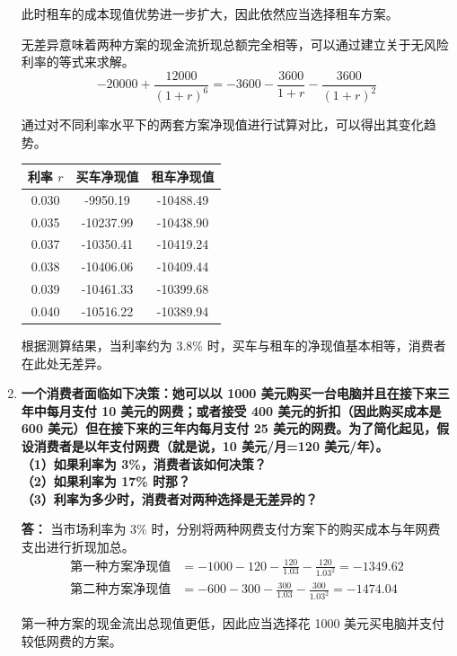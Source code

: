 \begin{enumerate}[label=\textbf{\arabic*.}, leftmargin=*]
		此时租车的成本现值优势进一步扩大，因此依然应当选择租车方案。
		
		无差异意味着两种方案的现金流折现总额完全相等，可以通过建立关于无风险利率的等式来求解。
		\[
		-20000 + \frac{12000}{(1+r)^6} = -3600 - \frac{3600}{1+r} - \frac{3600}{(1+r)^2}
		\]
		
		通过对不同利率水平下的两套方案净现值进行试算对比，可以得出其变化趋势。
		\begin{center}
			\small
			\setlength{\tabcolsep}{8pt}
			\renewcommand{\arraystretch}{1.2}
			\begin{tabular}{ccc}
				\hline
				利率 $r$ & 买车净现值 & 租车净现值 \\ \hline
				0.030 & -9950.19 & -10488.49 \\
				0.035 & -10237.99 & -10438.90 \\
				0.037 & -10350.41 & -10419.24 \\
				0.038 & -10406.06 & -10409.44 \\
				0.039 & -10461.33 & -10399.68 \\
				0.040 & -10516.22 & -10389.94 \\ \hline
			\end{tabular}
		\end{center}
		
		根据测算结果，当利率约为 3.8\% 时，买车与租车的净现值基本相等，消费者在此处无差异。
		
		\item \textbf{一个消费者面临如下决策：她可以以 1000 美元购买一台电脑并且在接下来三年中每月支付 10 美元的网费；或者接受 400 美元的折扣（因此购买成本是 600 美元）但在接下来的三年内每月支付 25 美元的网费。为了简化起见，假设消费者是以年支付网费（就是说，10 美元/月=120 美元/年）。\\（1）如果利率为 3\%，消费者该如何决策？\\（2）如果利率为 17\% 时那？\\（3）利率为多少时，消费者对两种选择是无差异的？}
		
		\textbf{答：}
		当市场利率为 3\% 时，分别将两种网费支付方案下的购买成本与年网费支出进行折现加总。
		\[
		\begin{aligned}
			\text{第一种方案净现值} &= -1000 - 120 - \frac{120}{1.03} - \frac{120}{1.03^2} = -1349.62 \\
			\text{第二种方案净现值} &= -600 - 300 - \frac{300}{1.03} - \frac{300}{1.03^2} = -1474.04
		\end{aligned}
		\]
		
		第一种方案的现金流出总现值更低，因此应当选择花 1000 美元买电脑并支付较低网费的方案。
		

\end{enumerate}
